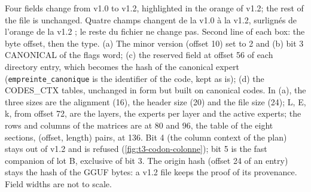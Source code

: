 {}
  {Four fields change from v1.0 to v1.2, highlighted in the orange of v1.2; the rest of the file is unchanged.}
  {Quatre champs changent de la v1.0 à la v1.2, surlignés de l'orange de la v1.2 ; le reste du fichier ne change pas.}
  {Second line of each box: the byte offset, then the type. (a) The minor version (offset 10) set to 2 and (b)
   bit 3 CANONICAL of the flags word; (c) the reserved field at offset 56 of each directory entry, which becomes
   the hash of the canonical expert (\texttt{empreinte\_canonique} is the identifier of the code, kept as is);
   (d) the CODES\_CTX tables, unchanged in form but built on canonical codes. In (a), the three sizes are the
   alignment (16), the header size (20) and the file size (24); L, E, k, from offset 72, are the layers, the
   experts per layer and the active experts; the rows and columns of the matrices are at 80 and 96, the table of
   the eight sections, (offset, length) pairs, at 136. Bit 4 (the column context of the plan) stays out of v1.2 and is
   refused (\cref{fig:t3-codon-colonne}); bit 5 is the fast companion of lot B, exclusive of bit 3. The origin
   hash (offset 24 of an entry) stays the hash of the GGUF bytes: a v1.2 file keeps the proof of its provenance.
   Field widths are not to scale.}
